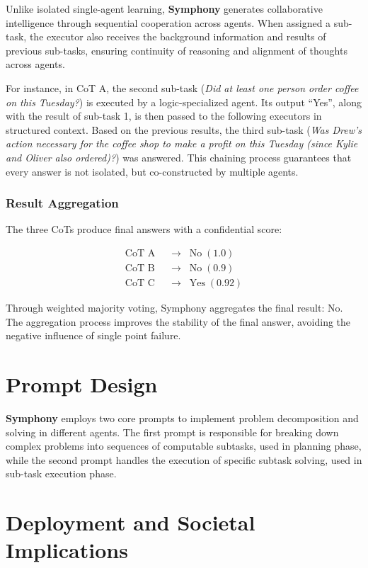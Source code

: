 \documentclass{article}
\begin{document}
Unlike isolated single-agent learning, \textbf{Symphony} generates collaborative intelligence through sequential cooperation across agents. When assigned a sub-task, the executor also receives the background information and results of previous sub-tasks, ensuring continuity of reasoning and alignment of thoughts across agents.

For instance, in CoT A, the second sub-task (\textit{Did at least one person order coffee on this Tuesday?}) is executed by a logic-specialized agent. Its output “Yes”, along with the result of sub-task 1, is then passed to the following executors in structured context. Based on the previous results, the third sub-task (\textit{Was Drew's action necessary for the coffee shop to make a profit on this Tuesday (since Kylie and Oliver also ordered)?}) was answered. This chaining process guarantees that every answer is not isolated, but co-constructed by multiple agents.

\subsubsection{Result Aggregation}
The three CoTs produce final answers with a confidential score:


\begin{align*}
\text{CoT A} &\;\;\rightarrow\;\; \text{No} \; (1.0) \\
\text{CoT B} &\;\;\rightarrow\;\; \text{No} \; (0.9) \\
\text{CoT C} &\;\;\rightarrow\;\; \text{Yes} \; (0.92)
\end{align*}



Through weighted majority voting, Symphony aggregates the final result: No. The aggregation process improves the stability of the final answer, avoiding the negative influence of single point failure.

\section{Prompt Design}
\textbf{Symphony} employs two core prompts to implement problem decomposition and solving in different agents. The first prompt is responsible for breaking down complex problems into sequences of computable subtasks, used in planning phase, while the second prompt handles the execution of specific subtask solving, used in sub-task execution phase.


\section{Deployment and Societal Implications}
\label{app:social_implications}
\end{document}
